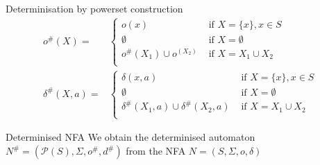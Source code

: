 \documentclass[compress]{beamer}
\begin{document}
\begin{frame}{Determinisation by powerset construction}
      \begin{align}
        o^\#(X) = &\begin{cases}
            o(x)                    &\text{ if } X = \{x\}, x \in S\\
            \emptyset               &\text{ if } X = \emptyset\\
            o^\#(X_1) \cup o^(X_2)  &\text{ if } X = X_1 \cup X_2\\
          \end{cases}\\
        \delta^\#(X, a) = &\begin{cases}
            \delta(x, a)                              &\text{ if } X =\{x\}, x \in S\\
            \emptyset                                 &\text{ if } X = \emptyset\\
            \delta^\#(X_1, a) \cup \delta^\#(X_2, a)  &\text{ if } X = X_1 \cup X_2\\
          \end{cases}
      \end{align}

  \begin{block}{Determinised NFA}
    We obtain the determinised automaton $N^\# = (\mathcal{P}(S), \Sigma, o^{\#}, d^{\#})$
      from the NFA $N = (S, \Sigma, o, \delta)$
  \end{block}
\end{frame}
\end{document}
